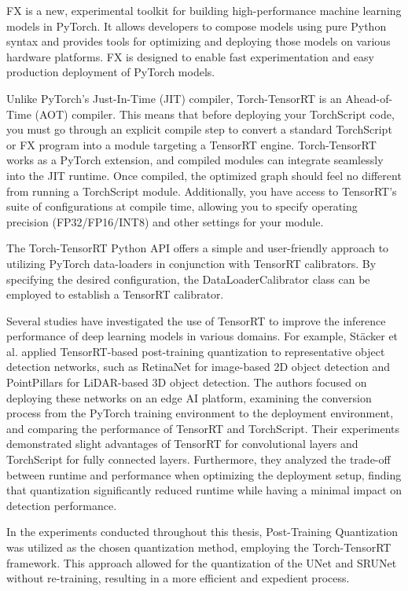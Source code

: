 FX is a new, experimental toolkit for building high-performance machine learning models in PyTorch. It allows developers to compose models using pure Python syntax and provides tools for optimizing and deploying those models on various hardware platforms. FX is designed to enable fast experimentation and easy production deployment of PyTorch models.

Unlike PyTorch's Just-In-Time (JIT) compiler, Torch-TensorRT is an Ahead-of-Time (AOT) compiler. This means that before deploying your TorchScript code, you must go through an explicit compile step to convert a standard TorchScript or FX program into a module targeting a TensorRT engine. Torch-TensorRT works as a PyTorch extension, and compiled modules can integrate seamlessly into the JIT runtime. Once compiled, the optimized graph should feel no different from running a TorchScript module. Additionally, you have access to TensorRT's suite of configurations at compile time, allowing you to specify operating precision (FP32/FP16/INT8) and other settings for your module.

The Torch-TensorRT Python API offers a simple and user-friendly approach to utilizing PyTorch data-loaders in conjunction with TensorRT calibrators. By specifying the desired configuration, the DataLoaderCalibrator class can be employed to establish a TensorRT calibrator.

Several studies have investigated the use of TensorRT to improve the inference performance of deep learning models in various domains. For example, St\"acker et al. \cite{stacker2021deployment} applied TensorRT-based post-training quantization to representative object detection networks, such as RetinaNet for image-based 2D object detection and PointPillars for LiDAR-based 3D object detection. The authors focused on deploying these networks on an edge AI platform, examining the conversion process from the PyTorch training environment to the deployment environment, and comparing the performance of TensorRT and TorchScript. Their experiments demonstrated slight advantages of TensorRT for convolutional layers and TorchScript for fully connected layers. Furthermore, they analyzed the trade-off between runtime and performance when optimizing the deployment setup, finding that quantization significantly reduced runtime while having a minimal impact on detection performance.

In the experiments conducted throughout this thesis, Post-Training Quantization was utilized as the chosen quantization method, employing the Torch-TensorRT framework. This approach allowed for the quantization of the UNet and SRUNet without re-training, resulting in a more efficient and expedient process.

